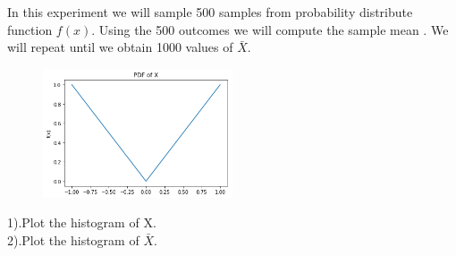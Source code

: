 \documentclass[12pt]{article}
\newenvironment{problem}[2][Problem]{\begin{trivlist}
\item[\hskip \labelsep {\bfseries #1}\hskip \labelsep {\bfseries #2.}]}{\end{trivlist}}
\begin{document}
\begin{problem}{5}
In this experiment we will sample 500 samples from probability distribute function $f(x)$. Using the 500 outcomes we will compute the
sample mean . We will repeat until we obtain 1000 values of $ \bar{X}$.\\
\begin{figure}
    \centering
    \includegraphics[width=0.5\textwidth]{hw7.png}
\end{figure}
1).Plot the histogram of X.\\
2).Plot the histogram of $\bar{X}$.
\end{problem}
\newpage
\end{document}
